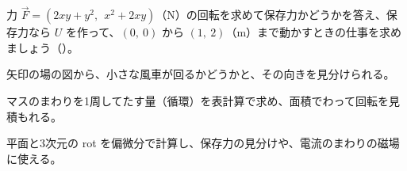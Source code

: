 \bkproblem 力 $\vec F=(2xy+y^2,\ \ x^2+2xy)$（N）の回転を求めて保存力かどうかを答え、保存力なら $U$ を作って、$(0,\ 0)$ から $(1,\ 2)$（m）まで動かすときの仕事を求めましょう\mbox{（）}。

\begin{furikaeri}
\begin{checklist}
\item 矢印の場の図から、小さな風車が回るかどうかと、その向きを見分けられる。
\item マスのまわりを1周してたす量（循環）を表計算で求め、面積でわって回転を見積もれる。
\item 平面と3次元の rot を偏微分で計算し、保存力の見分けや、電流のまわりの磁場に使える。
\end{checklist}
\end{furikaeri}

